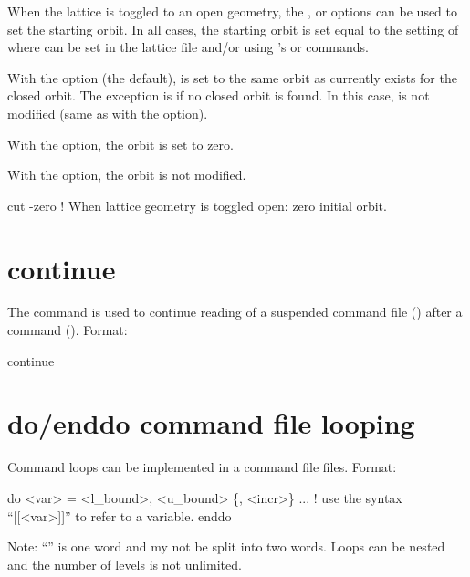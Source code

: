 When the lattice is toggled to an open geometry, the ,  or
 options can be used to set the starting orbit. In all cases, the starting orbit is set
equal to the setting of  where  can be set in the lattice file
and/or using \tao's  or  commands. 

With the  option (the default),  is set to the same orbit as
currently exists for the closed orbit. The exception is if no closed orbit is found. In this case,
 is not modified (same as with the  option).

With the  option, the  orbit is set to zero. 

With the  option, the  orbit is not modified.

\begin{example}
  cut -zero   ! When lattice geometry is toggled open: zero initial orbit.
\end{example}

\section{continue}
\label{s:continue}

The  command is used to continue reading of a suspended command file
() after a  command (). Format:
\begin{example}
  continue
\end{example}

\section{do/enddo command file looping}
\label{s:do}

Command loops can be implemented in a command file files. Format:
\begin{example}
  do <var> = <l_bound>, <u_bound> \{, <incr>\}
    ...   ! use the syntax ``[[<var>]]'' to refer to a variable.
  enddo
\end{example}
Note: ``'' is one word and my not be split into two words. Loops can be nested and the
number of levels is not unlimited.

